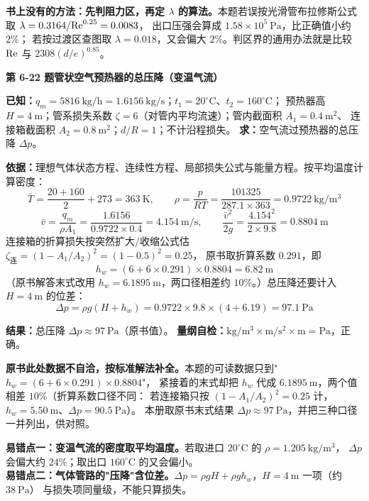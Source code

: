 \begin{tishi}
\textbf{书上没有的方法：先判阻力区，再定 $\lambda$ 的算法。}本题若误按光滑管布拉修斯公式取 $\lambda=0.3164/\mathrm{Re}^{0.25}=0.0083$，
出口压强会算成 $1.58\times10^5\ \mathrm{Pa}$，比正确值小约 $2\%$；
若按过渡区查图取 $\lambda=0.018$，又会偏大 $2\%$。判区界的通用办法就是比较 $\mathrm{Re}$ 与 $2308(d/e)^{0.85}$。
\end{tishi}

\noindent\textbf{第 6-22 题\quad 管状空气预热器的总压降（变温气流）}

\begin{jie}
\textbf{已知：}$q_m=5816\ \mathrm{kg/h}=1.6156\ \mathrm{kg/s}$；$t_1=20^\circ\mathrm{C}$、$t_2=160^\circ\mathrm{C}$；
预热器高 $H=4\ \mathrm{m}$；管系损失系数 $\zeta=6$（对管内平均流速）；管内截面积 $A_1=0.4\ \mathrm{m^2}$、
连接箱截面积 $A_2=0.8\ \mathrm{m^2}$；$d/R=1$；不计沿程损失。
\textbf{求：}空气流过预热器的总压降 $\Delta p$。

\textbf{依据：}理想气体状态方程、连续性方程、局部损失公式与能量方程。按平均温度计算密度：
\[ \bar T=\frac{20+160}{2}+273=363\ \mathrm{K},\qquad
\rho=\frac{p}{R T}=\frac{101325}{287.1\times363}=0.9722\ \mathrm{kg/m^3} \]
\[ \bar v=\frac{q_m}{\rho A_1}=\frac{1.6156}{0.9722\times0.4}=4.154\ \mathrm{m/s},\qquad
\frac{\bar v^2}{2g}=\frac{4.154^2}{2\times9.8}=0.8804\ \mathrm{m} \]
连接箱的折算损失按突然扩大/收缩公式估 $\zeta_{\text{连}}=(1-A_1/A_2)^2=(1-0.5)^2=0.25$，
原书取折算系数 $0.291$，即
\[ h_w=(6+6\times0.291)\times0.8804=6.82\ \mathrm{m} \]
（原书解答末式改用 $h_w=6.1895\ \mathrm{m}$，两口径相差约 $10\%$。）总压降还要计入 $H=4\ \mathrm{m}$ 的位差：
\[ \Delta p=\rho g(H+h_w)=0.9722\times9.8\times(4+6.19)=97.1\ \mathrm{Pa} \]

\textbf{结果：}总压降 $\Delta p\approx97\ \mathrm{Pa}$（原书值）。
\textbf{量纲自检：}$\mathrm{kg/m^3\times m/s^2\times m}=\mathrm{Pa}$，正确。
\end{jie}

\begin{tishi}
\textbf{原书此处数据不自洽，按标准解法补全。}本题的可读数据只到"$h_w=(6+6\times0.291)\times0.8804$"，
紧接着的末式却把 $h_w$ 代成 $6.1895\ \mathrm{m}$，两个值相差 $10\%$（折算系数口径不同：
若连接箱只按 $(1-A_1/A_2)^2=0.25$ 计，$h_w=5.50\ \mathrm{m}$、$\Delta p=90.5\ \mathrm{Pa}$）。
本册取原书末式结果 $\Delta p\approx97\ \mathrm{Pa}$，并把三种口径一并列出，供对照。
\end{tishi}

\begin{yicuo}
\textbf{易错点一：变温气流的密度取平均温度。}若取进口 $20^\circ\mathrm{C}$ 的 $\rho=1.205\ \mathrm{kg/m^3}$，
$\Delta p$ 会偏大约 $24\%$；取出口 $160^\circ\mathrm{C}$ 的又会偏小。\\
\textbf{易错点二：气体管路的"压降"含位差。}$\Delta p=\rho gH+\rho g h_w$，$H=4\ \mathrm{m}$ 一项（约 $38\ \mathrm{Pa}$）
与损失项同量级，不能只算损失。
\end{yicuo}

